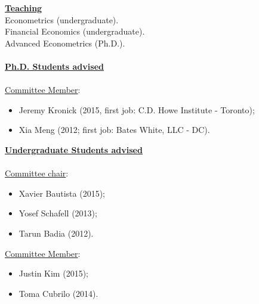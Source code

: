 \documentclass[12pt]{article}
\begin{document}
\underline{\textbf{Teaching}}\\
Econometrics (undergraduate).\\
Financial Economics (undergraduate). \\
Advanced Econometrics (Ph.D.). \\ \\
\underline{\textbf{Ph.D. Students advised}} \\ \\
\underline{Committee Member}: 
\begin{itemize}
	\item Jeremy Kronick (2015, first job: C.D. Howe Institute - Toronto);
	\item Xia Meng (2012; first job: Bates White, LLC - DC). 
\end{itemize}
\underline{\textbf{Undergraduate Students advised}} \\ \\
\underline{Committee chair}: 
\begin{itemize}
	\item Xavier Bautista (2015);
	\item Yosef Schafell (2013);
	\item Tarun Badia (2012). 
\end{itemize}
\underline{Committee Member}: 
\begin{itemize}
	\item Justin Kim (2015);
	\item Toma Cubrilo (2014).
\end{itemize}
\end{document}
